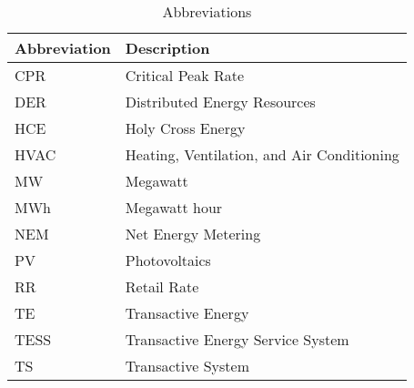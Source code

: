 \begin{table}[ht]
\centering
\caption{Abbreviations}
\begin{tabular}{l|l}

\textbf{Abbreviation} & \textbf{Description} \\
\hline
CPR & Critical Peak Rate \\
DER & Distributed Energy Resources \\
HCE & Holy Cross Energy \\
HVAC & Heating, Ventilation, and Air Conditioning \\
MW & Megawatt \\
MWh & Megawatt hour \\
NEM & Net Energy Metering \\
PV & Photovoltaics \\
RR & Retail Rate \\
TE & Transactive Energy \\
TESS & Transactive Energy Service System \\
TS & Transactive System
\end{tabular}

\end{table}